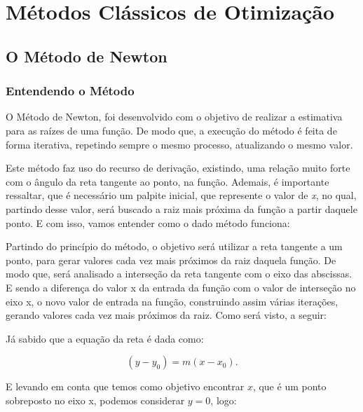 

\chapter{\Large{Métodos Clássicos de Otimização}}\label{chp:2}


\section{{O Método de Newton}}


\subsection{Entendendo o Método}


\hspace{0.8cm}
O Método de Newton, foi desenvolvido com o objetivo de realizar a estimativa
para as raízes de uma função. De modo que, a execução do método é feita de
forma iterativa, repetindo sempre o mesmo processo, atualizando o mesmo valor.

Este método faz uso do recurso de derivação, existindo, uma relação muito
forte com o ângulo da reta tangente ao ponto, na função. Ademais, é
importante ressaltar, que é necessário um palpite inicial, que represente
o valor de \textit{x}, no qual, partindo desse valor, será buscado a raiz mais
próxima da função a partir daquele ponto. E com isso, vamos entender como o
dado método funciona:

Partindo do princípio do método, o objetivo será utilizar a reta tangente a um
ponto, para gerar valores cada vez mais próximos da raiz daquela função. De
modo que, será analisado a interseção da reta tangente com o eixo das
abscissas. E sendo a diferença do valor x da entrada da função com o valor de
interseção no eixo x, o novo valor de entrada na função, construindo assim
várias iterações, gerando valores cada vez mais próximos da raiz. Como será
visto, a seguir:

Já sabido que a equação da reta é dada como:

\begin{equation}
    (y - y_0) = m(x - x_0).
\end{equation}

E levando em conta que temos como objetivo encontrar $x$, que é um ponto
sobreposto no eixo x, podemos considerar $y=0$, logo:

